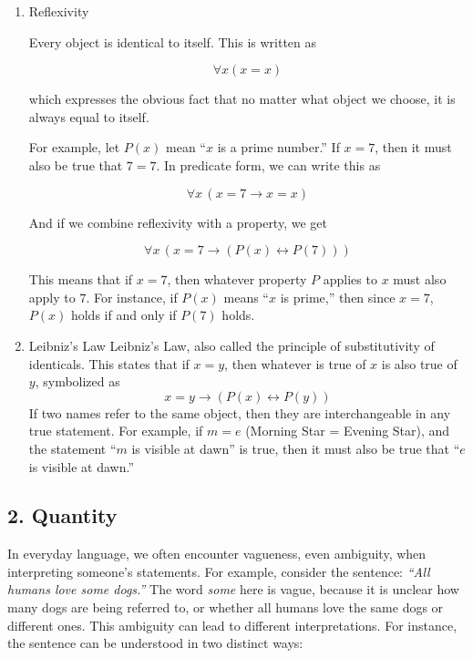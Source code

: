 \begin{enumerate}
\def\labelenumi{\arabic{enumi}.}
\item
  Reflexivity

  Every object is identical to itself. This is written as

  \[\forall x (x = x)\]

  which expresses the obvious fact that no matter what object we choose,
  it is always equal to itself.

  For example, let \(P(x)\) mean ``\(x\) is a prime number.'' If
  \(x = 7\), then it must also be true that \(7 = 7\). In predicate
  form, we can write this as

  \[\forall x \, (x = 7 \to x = x)\]

  And if we combine reflexivity with a property, we get

  \[\forall x \, (x = 7 \to (P(x) \leftrightarrow P(7)))\]

  This means that if \(x = 7\), then whatever property \(P\) applies to
  \(x\) must also apply to \(7\). For instance, if \(P(x)\) means
  ``\(x\) is prime,'' then since \(x = 7\), \(P(x)\) holds if and only
  if \(P(7)\) holds.
\item
  Leibniz's Law Leibniz's Law, also called the principle of
  substitutivity of identicals. This states that if \(x = y\), then
  whatever is true of \(x\) is also true of \(y\), symbolized as
  \[x = y \rightarrow (P(x) \leftrightarrow P(y))\] If two names refer
  to the same object, then they are interchangeable in any true
  statement. For example, if \(m = e\) (Morning Star = Evening Star),
  and the statement ``\(m\) is visible at dawn'' is true, then it must
  also be true that ``\(e\) is visible at dawn.''
\end{enumerate}

\subsection{2. Quantity}\label{quantity}

In everyday language, we often encounter vagueness, even ambiguity, when
interpreting someone's statements. For example, consider the sentence:
\emph{``All humans love some dogs.''} The word \emph{some} here is
vague, because it is unclear how many dogs are being referred to, or
whether all humans love the same dogs or different ones. This ambiguity
can lead to different interpretations. For instance, the sentence can be
understood in two distinct ways:

